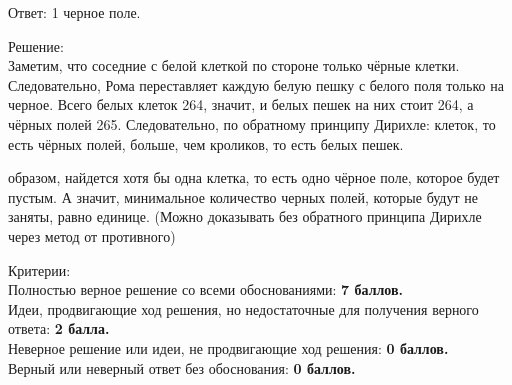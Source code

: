 \hspace{3mm}

Ответ: 1 черное поле.

Решение:\\
Заметим, что соседние с белой клеткой по стороне только чёрные клетки. Следовательно, Рома переставляет каждую белую пешку с белого поля только на черное. Всего белых клеток 264, значит, и белых пешек на них стоит 264, а чёрных полей 265. Следовательно, по обратному принципу Дирихле: клеток, то есть чёрных полей, больше, чем кроликов, то есть белых пешек.

\newpage

\hspace{3mm}

 образом, найдется хотя бы одна клетка, то есть одно чёрное поле, которое будет пустым. А значит, минимальное количество черных полей, которые будут не заняты, равно единице. (Можно доказывать без обратного принципа Дирихле через метод от противного)

\hspace{3mm}

Критерии:\\
Полностью верное решение со всеми обоснованиями: \textbf{7 баллов.}\\
Идеи, продвигающие ход решения, но недостаточные для получения верного ответа: \textbf{2 балла.}\\
Неверное решение или идеи, не продвигающие ход решения: \textbf{0 баллов.}\\
Верный или неверный ответ без обоснования: \textbf{0 баллов.}

